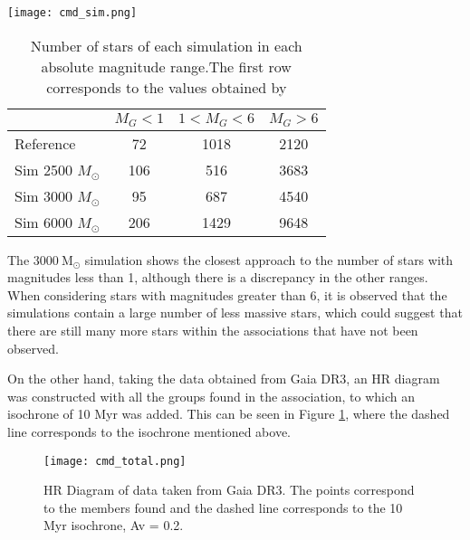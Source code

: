 \documentclass[baaa]{baaa}
\begin{document}
\begin{figure*}[!t]
\centering
\texttt{[image: cmd\_sim.png]}
\caption{HR diagrams obtained from the simulations. \emph{Left panel:} simulation of $2500~\mathrm{M_{\odot}}$. \emph{Center panel:} simulation of $3000~\mathrm{M_{\odot}}$. \emph{Right panel:} simulation of $6000~\mathrm{M_{\odot}}$. }
\label{Figura1}
\end{figure*}

\begin{table}[!t]
\centering
\caption{Number of stars of each simulation in each absolute magnitude range.The first row corresponds to the values obtained by \citep{cantat}}
\begin{tabular}{lccc}
\hline\hline\noalign{\smallskip}
\!\!  & \!\!\!\! $M_G < 1 $ & \!\!\!\! $1 < M_G < 6 $ & $ M_G > 6 $  \!\!\!\!\\
\hline\noalign{\smallskip}
\!\! Reference & 72 & 1018  & 2120 \\
\!\!Sim 2500 $M_{\odot}$& 106 & 516 & 3683 \\
\!\!Sim 3000 $M_{\odot}$& 95 & 687 & 4540  \\
\!\!Sim 6000 $M_{\odot}$& 206 & 1429  & 9648 \\


\hline
\end{tabular}
\label{tabla2}
\end{table}

The $3000~\mathrm{M_{\odot}}$ simulation shows the closest approach to the number of stars with magnitudes less than 1, although there is a discrepancy in the other ranges. When considering stars with magnitudes greater than 6, it is observed that the simulations contain a large number of less massive stars, which could suggest that there are still many more stars within the associations that have not been observed.

On the other hand, taking the data obtained from Gaia DR3, an HR diagram was constructed with all the groups found in the association, to which an isochrone of 10 Myr was added. 
This can be seen in Figure \ref{Figura3}, where the dashed line corresponds to the isochrone mentioned above.


\begin{figure}[!t]
\centering
\texttt{[image: cmd\_total.png]}
\caption{HR Diagram of data taken from Gaia DR3. The points correspond to the members found and the dashed line corresponds to the 10 Myr isochrone, Av = 0.2.}
\label{Figura3}
\end{figure}
\end{document}
